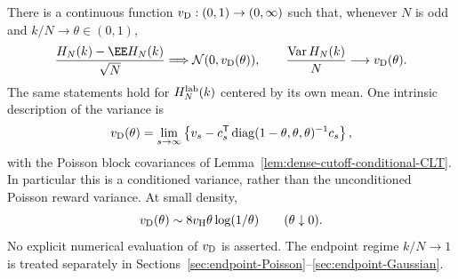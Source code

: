 \documentclass[11pt,letterpaper]{article}
\begin{document}
\begin{theorem}
\label{thm:dense-history-CLT}
There is a continuous function $v_{\rm D}:(0,1)\to(0,\infty)$
such that, whenever $N$ is odd and $k/N\to\theta\in(0,1)$,
\begin{equation}\label{eq:dense-history-CLT}
 \frac{H_N(k)-\EE H_N(k)}{\sqrt N}
       \Longrightarrow\mathcal N(0,v_{\rm D}(\theta)),\qquad
 \frac{\operatorname{Var}H_N(k)}N\longrightarrow v_{\rm D}(\theta).
\end{equation}
The same statements hold for $H_N^{\rm lab}(k)$ centered by
its own mean. One intrinsic description of the variance is
\[
 v_{\rm D}(\theta)=\lim_{s\to\infty}
 \left\{v_s-c_s^{\mathsf T}
       \operatorname{diag}(1-\theta,\theta,\theta)^{-1}c_s\right\},
\]
with the Poisson block covariances of
Lemma~\ref{lem:dense-cutoff-conditional-CLT}.
In particular this is a conditioned variance, rather than
the unconditioned Poisson reward variance.
At small density,
\begin{equation}\label{eq:dense-variance-small-density}
 v_{\rm D}(\theta)\sim8v_{\rm H}\theta\log(1/\theta)
                                      \qquad(\theta\downarrow0).
\end{equation}
No explicit numerical evaluation of $v_{\rm D}$ is asserted.
The endpoint regime $k/N\to1$ is treated separately in
Sections~\ref{sec:endpoint-Poisson}--\ref{sec:endpoint-Gaussian}.
\end{theorem}
\end{document}
